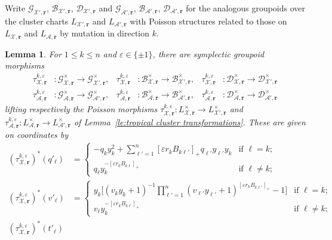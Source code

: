 \documentclass{amsart}
\newtheorem{lemma}[theorem]{Lemma}
\numberwithin{equation}{section}
\newcommand{\bfr}{{\boldsymbol{r}}}
\newcommand{\cA}{\mathcal{A}}
\newcommand{\cB}{\mathcal{B}}
\newcommand{\cD}{\mathcal{D}}
\newcommand{\cG}{\mathcal{G}}
\newcommand{\cX}{\mathcal{X}}
\begin{document}
Write $\cG_{\cX',\bfr}$, $\cB_{\cX',\bfr}$, $\cD_{\cX',\bfr}$ and $\cG_{\cA',\bfr}$, $\cB_{\cA',\bfr}$, $\cD_{\cA',\bfr}$ for the analogous groupoids over the cluster charts $L_{\cX',\bfr}$ and $L_{\cA',\bfr}$ with Poisson structures related to those on $L_{\cX,\bfr}$ and $L_{\cA,\bfr}$ by mutation in direction $k$.
\begin{lemma}
  \label{le:tropical groupoid transformations}
  For $1\le k\le n$ and $\varepsilon\in\{\pm1\}$, there are symplectic groupoid morphisms 
  \begin{align*}
    \tau_{\cX,\bfr}^{k,\varepsilon}&:\cG^\times_{\cX,\bfr}\to\cG^\times_{\cX',\bfr},& \tau_{\cX,\bfr}^{k,\varepsilon}&:\cB^\times_{\cX,\bfr}\to\cB^\times_{\cX',\bfr},& \tau_{\cX,\bfr}^{k,\varepsilon}&:\cD^\times_{\cX,\bfr}\to\cD^\times_{\cX',\bfr}\\
    \tau_{\cA,\bfr}^{k,\varepsilon}&:\cG^\times_{\cA,\bfr}\to\cG^\times_{\cA',\bfr},& \tau_{\cA,\bfr}^{k,\varepsilon}&:\cB^\times_{\cA,\bfr}\to\cB^\times_{\cA',\bfr},& \tau_{\cA,\bfr}^{k,\varepsilon}&:\cD^\times_{\cA,\bfr}\to\cD^\times_{\cA',\bfr}
  \end{align*}
  lifting respectively the Poisson morphisms $\tau_{\cX,\bfr}^{k,\varepsilon}:L^\times_{\cX,\bfr}\to L^\times_{\cX',\bfr}$ and $\tau_{\cA,\bfr}^{k,\varepsilon}:L^\times_{\cA,\bfr}\to L^\times_{\cA',\bfr}$ of Lemma~\ref{le:tropical cluster transformations}.
  These are given on coordinates by
  \begin{align}
    \label{eq:tropical GX transformation}
    (\tau_{\cX,\bfr}^{k,\varepsilon})^*(q'_\ell)
    &=\begin{cases} 
      -q_k y_k^2 + \sum\limits_{\ell'=1}^n [\varepsilon r_k B_{k\ell'}]_+ q_{\ell'} y_{\ell'} y_k & \text{if $\ell=k$;}\\ 
      q_\ell y_k^{-[\varepsilon r_k B_{k\ell}]_+} & \text{if $\ell\ne k$;}
    \end{cases}\\
    \label{eq:tropical BX transformation}
    (\tau_{\cX,\bfr}^{k,\varepsilon})^*(v'_\ell)
    &=\begin{cases} 
      y_k\Big[(v_k y_k + 1)^{-1}\prod\limits_{\ell'=1}^n (v_{\ell'} y_{\ell'} + 1)^{[\varepsilon r_k B_{k\ell'}]_+} -1\Big] & \text{if $\ell=k$;}\\
      v_\ell y_k^{-[\varepsilon r_k B_{k\ell}]_+} & \text{if $\ell\ne k$;}
    \end{cases}\\
    \label{eq:tropical DX transformation}
    (\tau_{\cX,\bfr}^{k,\varepsilon})^*(t'_\ell)

\end{align}
\end{lemma}
\end{document}
